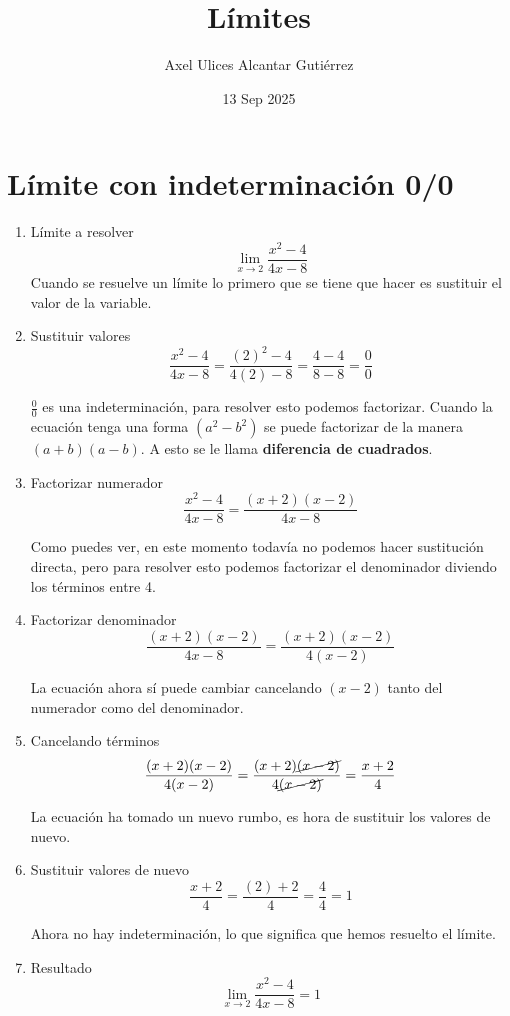 \documentclass[a4paper,10pt]{article}
\title{Límites}
\author{Axel Ulices Alcantar Gutiérrez}
\date{13 Sep 2025}
\begin{document}
\maketitle

\section{Límite con indeterminación 0/0}

\begin{enumerate}
	\item Límite a resolver
	      \[
		      \lim_{x\to2}\frac{x^{2} - 4}{4x - 8}
	      \]
	      Cuando se resuelve un límite lo primero que se tiene que hacer es sustituir el valor de la variable.

	\item Sustituir valores
	      \[
		      \frac{x^{2} - 4}{4x - 8} = \frac{(2)^{2} - 4}{4(2) - 8} = \frac{4 - 4}{8 - 8} = \frac{0}{0}
	      \]

	      $\frac{0}{0}$ es una indeterminación, para resolver esto podemos factorizar. Cuando la ecuación tenga una forma $(a^2 - b^2)$ se puede factorizar de la manera $(a + b)(a - b)$. A esto se le llama \textbf{diferencia de cuadrados}.

	\item Factorizar numerador
	      \[
		      \frac{x^{2} - 4}{4x - 8} = \frac{(x + 2)(x - 2)}{4x - 8}
	      \]

	      Como puedes ver, en este momento todavía no podemos hacer sustitución directa, pero para resolver esto podemos factorizar el denominador diviendo los términos entre 4.

	\item Factorizar denominador
	      \[
		      \frac{(x + 2)(x - 2)}{4x - 8} = \frac{(x + 2)(x - 2)}{4(x - 2)}
	      \]

	      La ecuación ahora sí puede cambiar cancelando $(x - 2)$ tanto del numerador como del denominador.

	\item Cancelando términos
	      \[
		      \frac{(x + 2)(x - 2)}{4(x - 2)} = \frac{(x + 2)\cancel{(x - 2)}}{4\cancel{(x - 2)}} = \frac{x + 2}{4}
	      \]

	      La ecuación ha tomado un nuevo rumbo, es hora de sustituir los valores de nuevo.

	\item Sustituir valores de nuevo
	      \[
		      \frac{x + 2}{4} = \frac{(2) + 2}{4} = \frac{4}{4} = 1
	      \]

	      Ahora no hay indeterminación, lo que significa que hemos resuelto el límite.

	\item Resultado
	      \[
		      \boxed{\lim_{x\to2}\frac{x^{2} - 4}{4x - 8} = 1}
	      \]

\end{enumerate}
\end{document}

